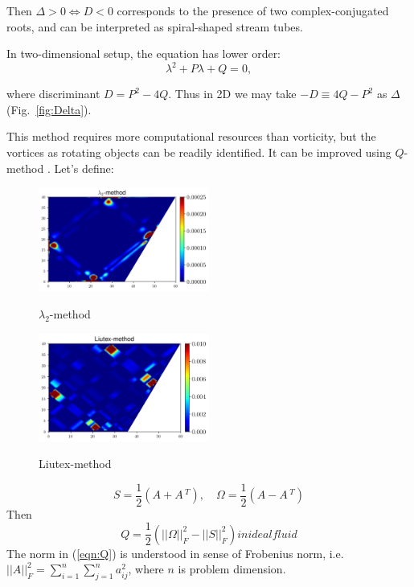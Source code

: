 \documentclass[a4wide,fontsize=12pt]{article}
\begin{document}
Then 
$ \Delta > 0  \Leftrightarrow  D < 0$ corresponds to the presence of two complex-conjugated roots, and can be interpreted as spiral-shaped stream tubes.

In two-dimensional setup, the equation has lower order:
$$\lambda^2+P\lambda+Q=0,$$

\noindent
where discriminant $D=P^2-4Q$. Thus in 2D we may take $-D\equiv 4Q-P^2$ as $\Delta$ (Fig.~\ref{fig:Delta}).

This method requires more computational resources than vorticity, but the vortices as rotating objects can be readily identified. It can be improved using $Q$-method \cite{vortex}\cite{Hussain}. Let's define:

\begin{figure}
\begin{multicols}{2}
    \centering
    \includegraphics[width=0.5\textwidth]{Figs/VortexLambda2.png}
    \caption{$\lambda_2$-method}
    \label{fig:L2}
    \hfill
    \includegraphics[width=0.5\textwidth]{Figs/VortexLui.png}
    \caption{Liutex-method}
    \label{fig:Liu}
    \end{multicols}
\end{figure}

\begin{equation}
 S=\frac{1}{2}\left(A +A\,^T \right) ,\quad \Omega=\frac{1}{2} \left( A - A\,^T\right) 
  \label{NSdim}
\end{equation}
Then
\begin{equation}
  Q=\frac{1}{2} \left( ||\Omega||^2_F-||S||^2_F \right) in ideal fluid 
  \label{eqn:Q}
 \end{equation}
The norm in (\ref{eqn:Q}) is understood in sense of Frobenius norm, i.e. $||A||^2_F=\sum \limits_{i=1}^n \sum \limits_{j=1}^n a_{ij}^2$, where $n$ is problem dimension.
\end{document}
